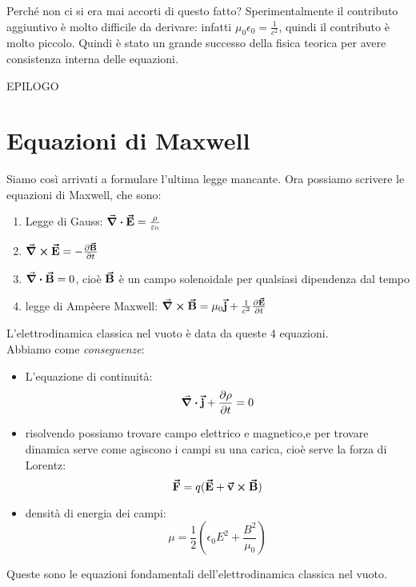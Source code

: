 Perché non ci si era mai accorti di questo fatto? Sperimentalmente il contributo aggiuntivo è molto difficile da derivare: infatti $\mu_0\epsilon_0=\frac{1}{c^2}$, quindi il contributo è molto piccolo. Quindi è stato un grande successo della fisica teorica per avere consistenza interna delle equazioni.


EPILOGO
\section{Equazioni di Maxwell}
Siamo così arrivati a formulare l'ultima legge mancante. Ora possiamo scrivere le equazioni di Maxwell, che sono:
\begin{enumerate}
	\item Legge di Gauss: $\div\vb*{\va{E}}=\frac{\rho}{\varepsilon_0}$
	\item $\curl\vb*{\va{E}}=-\pdv{\vb*{\va{B}}}{t}$
	\item $\div\vb*{\va{B}}=0$, cioè $\vb*{\va{B}}$ è un campo solenoidale per qualsiasi dipendenza dal tempo
	\item legge di Ampèere Maxwell: $\curl\vb*{\va{B}}=\mu_0\vb*{\va{j}}+ \frac{1}{c^2}\pdv{\vb*{\va{E}}}{t}$
\end{enumerate}
L'elettrodinamica classica nel vuoto è data da queste 4 equazioni.\\

Abbiamo come \textit{conseguenze}: 
\begin{itemize}
	\item L'equazione di continuità:
	\begin{equation*}
		\div\vb*{\va{j}}+\pdv{\rho}{t}=0
	\end{equation*}
	\item risolvendo possiamo trovare campo elettrico e magnetico,e  per trovare dinamica serve come agiscono i campi su una carica, cioè serve la forza di Lorentz:
	\begin{equation*}
		\vb*{\va{F}}=q(\vb*{\va{E}}+\vb*{\va{v}}\cross\vb*{\va{B}})
	\end{equation*}
	\item densità di energia dei campi: 
	\begin{equation*}
		\mu=\frac{1}{2}\left(\epsilon_0 E^2+\frac{B^2}{\mu_0}\right)
	\end{equation*}
\end{itemize}
Queste sono le equazioni fondamentali dell'elettrodinamica classica nel vuoto.\\

